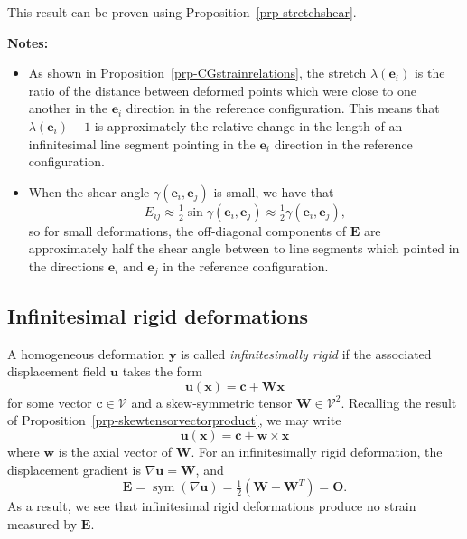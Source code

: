 \documentclass[
  letterpaper,
  DIV=11,
  numbers=noendperiod]{scrreprt}
\theoremstyle{plain}
\theoremstyle{remark}
\begin{document}
This result can be proven using Proposition~\ref{prp-stretchshear}.

\textbf{Notes:}

\begin{itemize}
\item
  As shown in Proposition~\ref{prp-CGstrainrelations}, the stretch
  \(\lambda({\boldsymbol{e}}_i)\) is the ratio of the distance between
  deformed points which were close to one another in the
  \({\boldsymbol{e}}_i\) direction in the reference configuration. This
  means that \(\lambda({\boldsymbol{e}}_i)-1\) is approximately the
  relative change in the length of an infinitesimal line segment
  pointing in the \({\boldsymbol{e}}_i\) direction in the reference
  configuration.
\item
  When the shear angle \(\gamma({\boldsymbol{e}}_i,{\boldsymbol{e}}_j)\)
  is small, we have that
  \[E_{ij}\approx \tfrac12\sin\gamma({\boldsymbol{e}}_i,{\boldsymbol{e}}_j)\approx \tfrac12\gamma({\boldsymbol{e}}_i,{\boldsymbol{e}}_j),\]
  so for small deformations, the off-diagonal components of
  \({\boldsymbol{E}}\) are approximately half the shear angle between to
  line segments which pointed in the directions \({\boldsymbol{e}}_i\)
  and \({\boldsymbol{e}}_j\) in the reference configuration.
\end{itemize}

\subsection{Infinitesimal rigid
deformations}\label{infinitesimal-rigid-deformations}

A homogeneous deformation \({\boldsymbol{y}}\) is called
\emph{infinitesimally rigid} if the associated displacement field
\({\boldsymbol{u}}\) takes the form
\[{\boldsymbol{u}}({\boldsymbol{x}}) = {\boldsymbol{c}}+{\boldsymbol{W}}{\boldsymbol{x}}\]
for some vector \({\boldsymbol{c}}\in{\mathcal{V}}\) and a
skew-symmetric tensor \({\boldsymbol{W}}\in{\mathcal{V}}^2\). Recalling
the result of Proposition~\ref{prp-skewtensorvectorproduct}, we may
write
\[{\boldsymbol{u}}({\boldsymbol{x}}) = {\boldsymbol{c}}+{\boldsymbol{w}}\times{\boldsymbol{x}}\]
where \({\boldsymbol{w}}\) is the axial vector of \({\boldsymbol{W}}\).
For an infinitesimally rigid deformation, the displacement gradient is
\(\nabla {\boldsymbol{u}}= {\boldsymbol{W}}\), and
\[{\boldsymbol{E}}= {\operatorname{sym}}(\nabla{\boldsymbol{u}}) = \tfrac12({\boldsymbol{W}}+{\boldsymbol{W}}^T) = {\boldsymbol{O}}.\]
As a result, we see that infinitesimal rigid deformations produce no
strain measured by \({\boldsymbol{E}}\).
\end{document}

